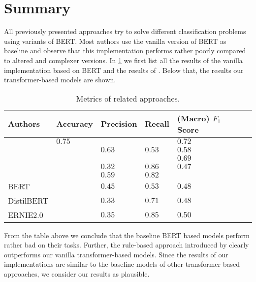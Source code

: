 \section{Summary}
All previously presented approaches try to solve different classification problems using variants of \ac{BERT}.
Most authors use the vanilla version of \ac{BERT} as baseline and observe that this implementation performs rather poorly compared to altered and complexer versions.
In \cref{tab:relation_to_existing_evidence:overview} we first list all the results of the vanilla implementation based on \ac{BERT} and the results of \textcite{Femmer:2017}.
Below that, the results our transformer-based models are shown.
\pagebreak %
\begin{table}[htpb]
    \centering
    \begin{tabular}{l | l l l l l}
        \toprule
         Authors & Accuracy& Precision & Recall & (Macro) $F_1$ Score  \\
        \midrule
        \Textcite{Xu:2019} & $0.75$ & & & $0.72$  \\
        \Textcite{Martino:2019} && $0.63$ & $0.53$ & $0.58$  \\
        \Textcite{Gao:2019} &&&& $0.69$  \\
        \Textcite{Lee:2019} && $0.32$ & $0.86$ & $0.47$  \\
        \midrule
        \Textcite{Femmer:2017} && $0.59$ &$0.82$ &  \\
        \midrule
        \ac{BERT} & & $0.45$ & $0.53$ & $0.48$ \\
        \ac{DistilBERT} & & $0.33$ & $0.71$ & $0.48$ \\
        \ac{ERNIE2.0} & & $0.35$ & $0.85$ & $0.50$\\
        \bottomrule
    \end{tabular}
    \caption[Metrics of Related Approaches]{Metrics of related approaches.}\label{tab:relation_to_existing_evidence:overview}
\end{table}

From the table above we conclude that the baseline \ac{BERT} based models perform rather bad on their tasks.
Further, the rule-based approach introduced by \textcite{Femmer:2017} clearly outperforms our vanilla transformer-based models.
Since the results of our implementations are similar to the baseline models of other transformer-based approaches, we consider our results as plausible.
